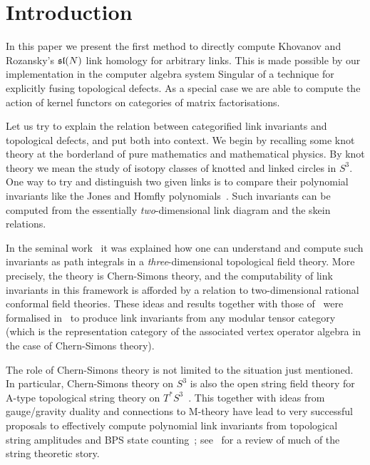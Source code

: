 \documentclass{compositio}
\theoremstyle{definition}
\numberwithin{equation}{section}
\begin{document}
\maketitle

\section{Introduction}

In this paper we present the first method to directly compute Khovanov and Rozansky's $\mathfrak{sl}(N)$ link homology for arbitrary links. This is made possible by our implementation in the computer algebra system Singular of a technique for explicitly fusing topological defects. As a special case we are able to compute the action of kernel functors on categories of matrix factorisations.

Let us try to explain the relation between categorified link invariants and topological defects, and put both into context. We begin by recalling some knot theory at the borderland of pure mathematics and mathematical physics. By knot theory we mean the study of isotopy classes of knotted and linked circles in $S^3$. One way to try and distinguish two given links is to compare their polynomial invariants like the Jones and Homfly polynomials~\cite{JonesPolynomialPaper, Homfly, HomflyPT}. Such invariants can be computed from the essentially \emph{two}-dimensional link diagram and the skein relations. 

In the seminal work~\cite{wittenjones} it was explained how one can understand and compute such invariants as path integrals in a \emph{three}-dimensional topological field theory. More precisely, the theory is Chern-Simons theory, and the computability of link invariants in this framework is afforded by a relation to two-dimensional rational conformal field theories. These ideas and results together with those of~\cite{t1988YB} were formalised in~\cite{RT1990, RT1991, turaevbook} to produce link invariants from any modular tensor category (which is the representation category of the associated vertex operator algebra in the case of Chern-Simons theory). 

The role of Chern-Simons theory is not limited to the situation just mentioned. In particular, Chern-Simons theory on $S^3$ is also the open string field theory for A-type topological string theory on $T^*S^3$~\cite{w9207094}. This together with ideas from gauge/gravity duality and connections to M-theory have lead to very successful proposals to effectively compute polynomial link invariants from topological string amplitudes and BPS state counting~\cite{gv9811131, ov9912123, lmv0010102}; see~\cite{marinoknotbook} for a review of much of the string theoretic story. 
\end{document}
